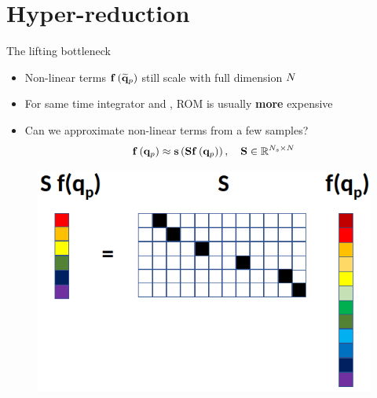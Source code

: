 \documentclass[]{beamer}
\begin{document}
	

\section*{Hyper-reduction}

\begin{frame}{The lifting bottleneck}
    \begin{itemize}
		\item Non-linear terms $\mathbf{f} \left(\mathbf{\widetilde{q}}_{p}\right)$ still scale with full dimension $N$
		\item For same time integrator and \dt, ROM is usually \textbf{more} expensive
		\item Can we approximate non-linear terms from a few samples?
		\begin{equation*}
			\mathbf{f} \left(\mathbf{q}_{p}\right) \approx \mathbf{s}\left(\mathbf{S} \mathbf{f} \left(\mathbf{q}_{p}\right)\right), \quad \mathbf{S} \in \mathbb{R}^{N_s \times N}
		\end{equation*}
	\end{itemize}
	\vspace{1em}
	\begin{figure}
		\centering
		\includegraphics[width=0.55\linewidth]{theory/samplingHelperVis.png}
	\end{figure}
\end{frame}
\end{document}
